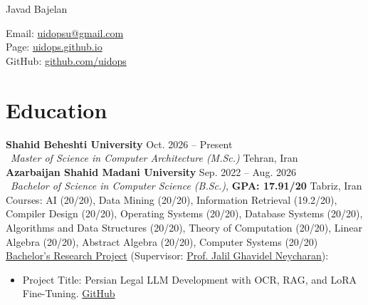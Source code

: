 \documentclass[12pt,a4paper]{article}
\begin{document}
\begin{minipage}[t]{0.55\textwidth}
    {\color{primaryblue}\fontsize{22}{26}\selectfont Javad Bajelan}
\end{minipage}%
\begin{minipage}[t]{0.45\textwidth}
    \raggedleft \small \color{textgrey}
    Email: \href{mailto:uidopsu@gmail.com}{uidopsu@gmail.com} \\
    Page: \href{https://uidops.github.io}{uidops.github.io} \\
    GitHub: \href{https://github.com/uidops}{github.com/uidops} \\
\end{minipage}

\vspace{8pt}

\section{Education}
    \textbf{Shahid Beheshti University} \hfill {\color{textgrey} Oct. 2026 -- Present} \\\
    \textit{Master of Science in Computer Architecture (M.Sc.)} \hfill {\color{textgrey} Tehran, Iran} \\[6pt]
    \textbf{Azarbaijan Shahid Madani University} \hfill {\color{textgrey} Sep. 2022 -- Aug. 2026} \\\
    \textit{Bachelor of Science in Computer Science (B.Sc.)}, \textbf{GPA: 17.91/20} \hfill {\color{textgrey} Tabriz, Iran} \\[6pt]
    Courses: AI (20/20), Data Mining (20/20), Information Retrieval (19.2/20), Compiler Design (20/20), Operating Systems (20/20), Database Systems (20/20), Algorithms and Data Structures (20/20), Theory of Computation (20/20), Linear Algebra (20/20), Abstract Algebra (20/20), Computer Systems (20/20)\\[6pt]
    \underline{Bachelor's Research Project} (Supervisor: \href{https://scholar.google.com/citations?user=45WM0HwAAAAJ}{\color{primaryblue} Prof. Jalil Ghavidel Neycharan}):
    \begin{itemize}[label=--]
        \item Project Title: Persian Legal LLM Development with OCR, RAG, and LoRA Fine-Tuning. \href{https://github.com/uidops/DIVAN-LM}{GitHub}
    \end{itemize}

\vspace{3pt}
\end{document}
